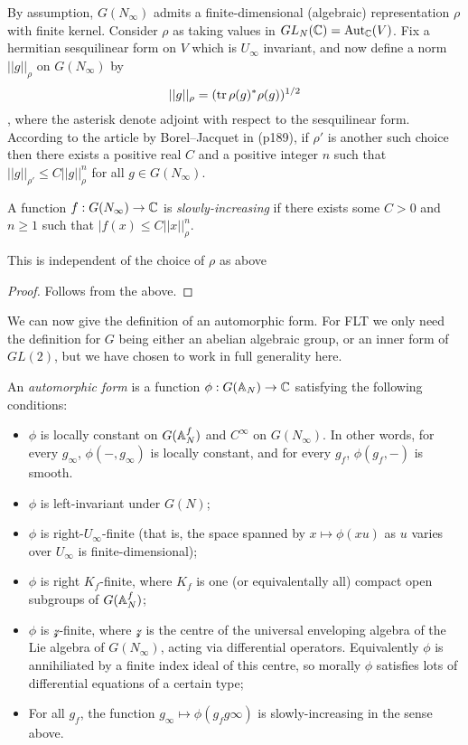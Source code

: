 By assumption, $G(N_\infty)$ admits a finite-dimensional (algebraic) representation $\rho$ with finite kernel. Consider $\rho$ as taking values in $GL_N({\mathbb{C}})=\operatorname{Aut}_{\mathbb{C}}(V)$. Fix a hermitian sesquilinear form on $V$ which 
is $U_\infty$ invariant, and now define a norm $||g||_\rho$ on $G(N_\infty)$ by $$||g||_\rho=(\operatorname{tr} \rho(g)^*\rho(g))^{1/2}$$, where the asterisk denote adjoint with respect to the sesquilinear form. According to the article by Borel--Jacquet in \cite{corvallis1} (p189), if $\rho'$ is another such choice then there exists a positive real $C$ and a positive integer $n$ such that $||g||_{\rho'}\leq C||g||_\rho^n$ for all $g\in G(N_\infty)$.

\begin{definition} A function $f : G(N_\infty)\to{\mathbb{C}}$ is \emph{slowly-increasing} if there exists some $C>0$
    and $n\geq1$ such that $|f(x)\leq C||x||_\rho^n$.
\end{definition}

\begin{theorem} This is independent of the choice of $\rho$ as above
\end{theorem}
\begin{proof} Follows from the above.
\end{proof}

We can now give the definition of an automorphic form. For FLT we only need the definition for $G$ being either an abelian algebraic group, or an inner form of $GL(2)$, but we have chosen to work in full generality here. 

\begin{definition} An \emph{automorphic form} is a function $\phi:G(\mathbb{A}_N)\to{\mathbb{C}}$ satisfying the following conditions:
    \begin{itemize}
        \item $\phi$ is locally constant on $G(\mathbb{A}_N^f)$ and $C^\infty$ on $G(N_\infty)$. In other words, for every $g_\infty$, $\phi(-,g_\infty)$ is locally constant, and for every $g_f$, $\phi(g_f,-)$ is smooth.
        \item $\phi$ is left-invariant under $G(N)$;
        \item $\phi$ is right-$U_\infty$-finite (that is, the space spanned by $x\mapsto \phi(xu)$ as $u$ varies over $U_\infty$ is finite-dimensional);
        \item $\phi$ is right $K_f$-finite, where $K_f$ is one (or equivalentally all) compact open subgroups of $G(\mathbb{A}_N^f)$;
        \item $\phi$ is $\mathcal{z}$-finite, where $\mathcal{z}$ is the centre of the universal enveloping algebra of the Lie algebra of $G(N_\infty)$, acting via differential operators. Equivalently $\phi$ is annihiliated by a finite index ideal of this centre, so morally $\phi$ satisfies lots of differential equations of a certain type;
        \item For all $g_f$, the function $g_\infty\mapsto \phi(g_f g\infty)$ is slowly-increasing in the sense above.
    \end{itemize}
\end{definition}

